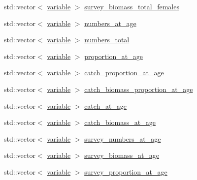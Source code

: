 \begin{DoxyCompactItemize}
\item 
std\-::vector$<$ \hyperlink{structmas_1_1_area_a3fb53ebc27c5323de15a81fbfbc7c878}{variable} $>$ \hyperlink{structmas_1_1_area_ac9e78d0a2d1fbb1d24d2a92205b9ec16}{survey\-\_\-biomass\-\_\-total\-\_\-females}
\item 
std\-::vector$<$ \hyperlink{structmas_1_1_area_a3fb53ebc27c5323de15a81fbfbc7c878}{variable} $>$ \hyperlink{structmas_1_1_area_aa9febdb0cb6d7832ce2d5f915795a886}{numbers\-\_\-at\-\_\-age}
\item 
std\-::vector$<$ \hyperlink{structmas_1_1_area_a3fb53ebc27c5323de15a81fbfbc7c878}{variable} $>$ \hyperlink{structmas_1_1_area_acb6bf1955e92c0864eee535a74ecb9bd}{numbers\-\_\-total}
\item 
std\-::vector$<$ \hyperlink{structmas_1_1_area_a3fb53ebc27c5323de15a81fbfbc7c878}{variable} $>$ \hyperlink{structmas_1_1_area_a973d245c1b74dc6099d174c3afe5e661}{proportion\-\_\-at\-\_\-age}
\item 
std\-::vector$<$ \hyperlink{structmas_1_1_area_a3fb53ebc27c5323de15a81fbfbc7c878}{variable} $>$ \hyperlink{structmas_1_1_area_a896fd8fcd47d539873630d45ec818ade}{catch\-\_\-proportion\-\_\-at\-\_\-age}
\item 
std\-::vector$<$ \hyperlink{structmas_1_1_area_a3fb53ebc27c5323de15a81fbfbc7c878}{variable} $>$ \hyperlink{structmas_1_1_area_acf32183c88a8bb1979036c7e34340c58}{catch\-\_\-biomass\-\_\-proportion\-\_\-at\-\_\-age}
\item 
std\-::vector$<$ \hyperlink{structmas_1_1_area_a3fb53ebc27c5323de15a81fbfbc7c878}{variable} $>$ \hyperlink{structmas_1_1_area_a1a1735c4520ba32f042d753486914fe6}{catch\-\_\-at\-\_\-age}
\item 
std\-::vector$<$ \hyperlink{structmas_1_1_area_a3fb53ebc27c5323de15a81fbfbc7c878}{variable} $>$ \hyperlink{structmas_1_1_area_a7db1d1a4c66e3c535133c2aecbb4cc29}{catch\-\_\-biomass\-\_\-at\-\_\-age}
\item 
std\-::vector$<$ \hyperlink{structmas_1_1_area_a3fb53ebc27c5323de15a81fbfbc7c878}{variable} $>$ \hyperlink{structmas_1_1_area_ab8802451bd599039ee254b6737e8fad9}{survey\-\_\-numbers\-\_\-at\-\_\-age}
\item 
std\-::vector$<$ \hyperlink{structmas_1_1_area_a3fb53ebc27c5323de15a81fbfbc7c878}{variable} $>$ \hyperlink{structmas_1_1_area_acaf171532a97cd7cd992779b02cce273}{survey\-\_\-biomass\-\_\-at\-\_\-age}
\item 
std\-::vector$<$ \hyperlink{structmas_1_1_area_a3fb53ebc27c5323de15a81fbfbc7c878}{variable} $>$ \hyperlink{structmas_1_1_area_a4a85aa755774a12a5fa4e7debda4cdad}{survey\-\_\-proportion\-\_\-at\-\_\-age}

\end{DoxyCompactItemize}
